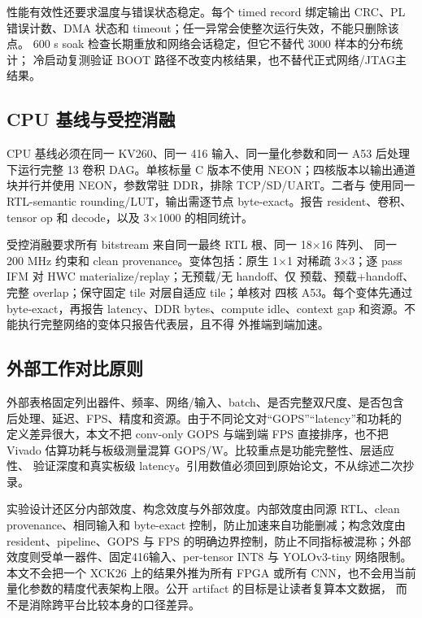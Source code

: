 性能有效性还要求温度与错误状态稳定。每个 timed record 绑定输出 CRC、PL
错误计数、DMA 状态和 timeout；任一异常会使整次运行失效，不能只删除该点。
600 s soak 检查长期重放和网络会话稳定，但它不替代 3000 样本的分布统计；
冷启动复测验证 BOOT 路径不改变内核结果，也不替代正式网络/JTAG主结果。

\subsection{CPU 基线与受控消融}

CPU 基线必须在同一 KV260、同一 416 输入、同一量化参数和同一 A53 后处理
下运行完整 13 卷积 DAG。单核标量 C 版本不使用 NEON；四核版本以输出通道
块并行并使用 NEON，参数常驻 DDR，排除 TCP/SD/UART。二者与 \LASA 使用同一
RTL-semantic rounding/LUT，输出需逐节点 byte-exact。报告 resident、卷积、
tensor op 和 decode，以及 3$\times$1000 的相同统计。

受控消融要求所有 bitstream 来自同一最终 RTL 根、同一 18$\times$16 阵列、
同一 200 MHz 约束和 clean provenance。变体包括：原生 1$\times$1 对稀疏
3$\times$3；逐 pass IFM 对 HWC materialize/replay；无预载/无 handoff、仅
预载、预载+handoff、完整 overlap；保守固定 tile 对层自适应 tile；单核对
四核 A53。每个变体先通过 byte-exact，再报告 latency、DDR bytes、compute
idle、context gap 和资源。不能执行完整网络的变体只报告代表层，且不得
外推端到端加速。



\subsection{外部工作对比原则}

外部表格固定列出器件、频率、网络/输入、batch、是否完整双尺度、是否包含
后处理、延迟、FPS、精度和资源。由于不同论文对“GOPS”“latency”和功耗的
定义差异很大，本文不把 conv-only GOPS 与端到端 FPS 直接排序，也不把
Vivado 估算功耗与板级测量混算 GOPS/W。比较重点是功能完整性、层适应性、
验证深度和真实板级 latency。引用数值必须回到原始论文，不从综述二次抄录。

实验设计还区分内部效度、构念效度与外部效度。内部效度由同源 RTL、clean
provenance、相同输入和 byte-exact 控制，防止加速来自功能删减；构念效度由
resident、pipeline、GOPS 与 FPS 的明确边界控制，防止不同指标被混称；外部
效度则受单一器件、固定416输入、per-tensor INT8 与 YOLOv3-tiny 网络限制。
本文不会把一个 XCK26 上的结果外推为所有 FPGA 或所有 CNN，也不会用当前
量化参数的精度代表架构上限。公开 artifact 的目标是让读者复算本文数据，
而不是消除跨平台比较本身的口径差异。
